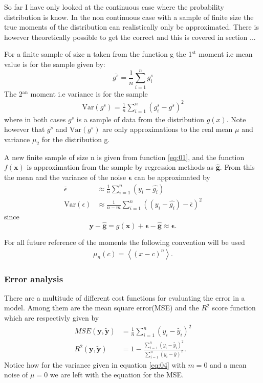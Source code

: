 \documentclass[uio,jmp,amsmath,amssymb,reprint]{revtex4-1}
\numberwithin{equation}{section}
\begin{document}
So far I have only looked at the continuous case where the probability distribution is know. In the non continuous case with a sample of finite size the true moments of the distribution can realistically only be approximated. There is however theoretically possible to get the correct and this is covered in section ...

For a finite sample of size n taken from the function g the 1\(^\text{st}\) moment i.e mean value is for the sample given by:
\begin{equation}\label{eq:02}
    \overline{g^s} = \frac{1}{n}\sum_{i=1}^n g_i^s
\end{equation}
The 2\(^\text{an}\) moment i.e variance is for the sample
\begin{align}\label{eq:03}
    \text{Var}(g^s) = \frac{1}{n}\sum_{i=1}^n (g^s_i - \overline{g^s})^2
\end{align}
where in both cases \(g^s\) is a sample of data from the distribution \(g(x)\). Note however that \(\overline{g^s}\) and \(\text{Var}(g^s)\) are only approximations to the real mean \(\mu\) and variance \(\mu_2\) for the distribution g.

A new finite sample of size n is given from function \ref{eq:01}, and the function \(f(\bm{x})\) is approximation from the sample by regression methods as \(\bm{\hat{g}}\). From this the mean and the variance of the noise \(\bm{\epsilon}\) can be approximated by
\begin{align}
    \overline{\epsilon} &\approx \frac{1}{n}\sum_{i=1}^n(y_i - \hat{g_i})\\ \label{eq:04}
    \text{Var}(\epsilon) &\approx \frac{1}{n - m}\sum_{i=1}^n ((y_i - \hat{g_i}) - \overline{\epsilon})^2
\end{align}
since
\begin{equation}
    \bm{y} - \bm{\hat{g}} = g(\bm{x}) + \bm{\epsilon} - \bm{\hat{g}}\approx \bm{\epsilon}.
\end{equation}

For all future reference of the moments the following convention will be used
\begin{align}
    \mu_n(c) = \left<(x-c)^n\right>.
\end{align}

\subsubsection{Error analysis}

There are a multitude of different cost functions for evaluating the error in a model. Among them are the mean square error(MSE) and the \(R^2\) score function which are respectivly given by
\begin{align}\label{eq:05}
    MSE(\bm{y}, \bm{\tilde{y}}) &= \frac{1}{n}\sum_{i=1}^n(y_i - \tilde{y_i})^2\\
    R^2(\bm{y}, \bm{\tilde{y}}) &= 1 - \frac{\sum_{i=1}^n(y_i - \tilde{y_i})^2}{\sum_{i=1}^n(y_i - \overline{y})^2}. 
\end{align}
Notice how for the variance given in equation \ref{eq:04} with \(m=0\) and a mean noise of \(\mu=0\) we are left with the equation for the MSE.
\end{document}
